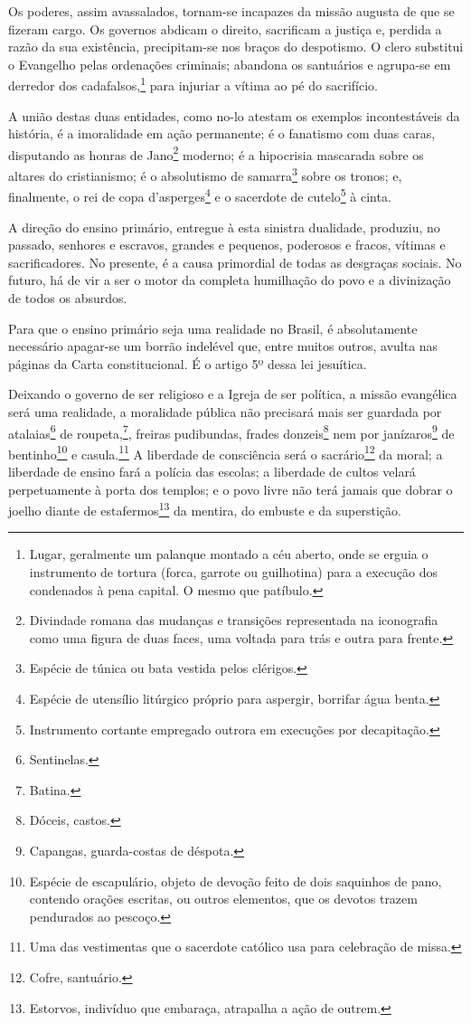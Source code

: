 Os poderes, assim avassalados, tornam-se incapazes da missão augusta de
que se fizeram cargo. Os governos abdicam o direito, sacrificam a
justiça e, perdida a razão da sua existência, precipitam-se nos braços
do despotismo. O clero substitui o Evangelho pelas ordenações criminais;
abandona os santuários e agrupa-se em derredor dos
cadafalsos,\footnote{Lugar, geralmente um palanque montado a céu
  aberto, onde se erguia o instrumento de tortura (forca, garrote ou
  guilhotina) para a execução dos condenados à pena capital. O mesmo que
  patíbulo.\label{cadafalso}} para injuriar a vítima ao pé do sacrifício.

A união destas duas entidades, como no-lo atestam os exemplos
incontestáveis da história, é a imoralidade em ação permanente; é o
fanatismo com duas caras, disputando as honras de Jano\footnote{
  Divindade romana das mudanças e transições representada na iconografia
  como uma figura de duas faces, uma voltada para trás e outra para
  frente.} moderno; é a hipocrisia mascarada sobre os altares do
cristianismo; é o absolutismo de samarra\footnote{Espécie de túnica ou
  bata vestida pelos clérigos.} sobre os tronos; e, finalmente, o rei de
copa d'asperges\footnote{Espécie de utensílio litúrgico próprio para
  aspergir, borrifar água benta.} e o sacerdote de cutelo\footnote{
  Instrumento cortante empregado outrora em execuções por decapitação.}
à cinta.

A direção do ensino primário, entregue à esta sinistra dualidade,
produziu, no passado, senhores e escravos, grandes e pequenos, poderosos
e fracos, vítimas e sacrificadores. No presente, é a causa primordial de
todas as desgraças sociais. No futuro, há de vir a ser o motor da
completa humilhação do povo e a divinização de todos os absurdos.

Para que o ensino primário seja uma realidade no Brasil, é absolutamente
necessário apagar-se um borrão indelével que, entre muitos outros,
avulta nas páginas da Carta constitucional. É o artigo 5º dessa lei
jesuítica.

Deixando o governo de ser religioso e a Igreja de ser política, a missão
evangélica será uma realidade, a moralidade pública não precisará mais
ser guardada por atalaias\footnote{Sentinelas.} de roupeta,\footnote{
  Batina.}, freiras pudibundas, frades donzeis\footnote{Dóceis,
  castos.} nem por janízaros\footnote{Capangas, guarda-costas de
  déspota.} de bentinho\footnote{Espécie de escapulário, objeto de
  devoção feito de dois saquinhos de pano, contendo orações escritas, ou
  outros elementos, que os devotos trazem pendurados ao pescoço.} e
casula.\footnote{Uma das vestimentas que o sacerdote católico usa para
  celebração de missa.} A liberdade de consciência será o
sacrário\footnote{Cofre, santuário.} da moral; a liberdade de ensino
fará a polícia das escolas; a liberdade de cultos velará perpetuamente à
porta dos templos; e o povo livre não terá jamais que dobrar o joelho
diante de estafermos\footnote{Estorvos, indivíduo que embaraça,
  atrapalha a ação de outrem.} da mentira, do embuste e da superstição.

